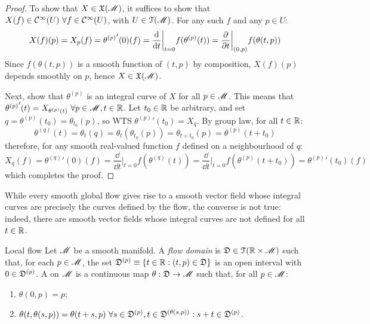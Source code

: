 \begin{proofbox}
  \begin{proof}
    To show that $ X \in \mathfrak{X}(\mathscr{M}) $, it suffices to show that $ X(f) \in \mathcal{C}^{\infty}(U) \,\,\forall f \in \mathcal{C}^{\infty}(U) $, with $ U \in \EuScript{T}(\mathscr{M}) $. For any such $ f $ and any $ p \in U $:
    \begin{equation*}
      X(f)(p) = X_p(f) = {\theta^{(p)}}'(0)(f) = \frac{\mathrm{d}}{\mathrm{d} t} \bigg\vert_{t = 0} f(\theta^{(p)}(t)) =  \frac{\partial}{\partial t} \bigg\vert_{(0,p)} f(\theta(t,p))
    \end{equation*}
    Since $ f(\theta(t,p)) $ is a smooth function of $ (t,p) $ by composition, $ X(f)(p) $ depends smoothly on $ p $, hence $ X \in \mathfrak{X}(\mathscr{M}) $.

    Next, show that $ \theta^{(p)} $ is an integral curve of $ X $ for all $ p \in \mathscr{M} $. This means that $ {\theta^{(p)}}'(t) = X_{\theta^{(p)}(t)} \,\,\forall p \in \mathscr{M} , t \in \mathbb{R} $. Let $ t_0 \in \mathbb{R} $ be arbitrary, and set $ q = \theta^{(p)}(t_0) = \theta_{t_0}(p) $, so WTS $ {\theta^{(p)}}'(t_0) = X_q $. By group law, for all $ t \in \mathbb{R} $:
    \begin{equation*}
      \theta^{(q)}(t) = \theta_t(q) = \theta_t(\theta_{t_0}(p)) = \theta_{t+t_0}(p) = \theta^{(p)}(t+t_0)
    \end{equation*}
    therefore, for any smooth real-valued function $ f $ defined on a neighbourhood of $ q $:
    \begin{equation*}
      X_q(f) = {\theta^{(q)}}'(0)(f) = \frac{\dd}{\dd t} \bigg\vert_{t=0} f(\theta^{(q)}(t)) = \frac{\dd}{\dd t} \bigg\vert_{t=0} f(\theta^{(p)}(t+t_0)) = {\theta^{(p)}}'(t_0)(f)
    \end{equation*}
    which completes the proof.
  \end{proof}
\end{proofbox}

While every smooth global flow gives rise to a smooth vector field whose integral curves are precisely the curves defined by the flow, the converse is not true: indeed, there are smooth vector fields whose integral curves are not defined for all $ t \in \mathbb{R} $.

\begin{definition}{Local flow}{}
  Let $ \mathscr{M} $ be a smooth manifold. A \emph{flow domain} is $ \mathfrak{D} \in \EuScript{T}(\mathbb{R} \times \mathscr{M}) $ such that, for each $ p \in \mathscr{M} $, the set $ \mathfrak{D}^{(p)} \equiv \{t \in \mathbb{R} : (t,p) \in \mathfrak{D}\} $ is an open interval with $ 0 \in \mathfrak{D}^{(p)} $. A  on $ \mathscr{M} $ is a continuous map $ \theta : \mathfrak{D} \rightarrow \mathscr{M} $ such that, for all $ p \in \mathscr{M} $:
  \begin{enumerate}
    \item $ \theta(0,p) = p $;
    \item $ \theta(t,\theta(s,p)) = \theta(t+s,p) \,\,\forall s \in \mathfrak{D}^{(p)} , t \in \mathfrak{D}^{(\theta(s,p))} : s+t \in \mathfrak{D}^{(p)} $.
  \end{enumerate}
\end{definition}

